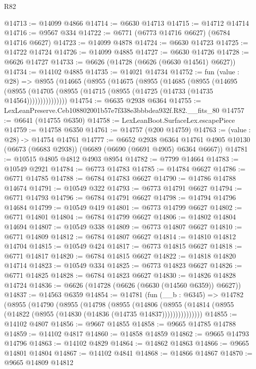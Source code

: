 \begin{lexlean}{R82}
\begin{coremodule}
@14713 := @14099 @4866
@14714 := @6630 @14713
@14715 := @14712 @14714
@14716 := @9567 @334
@14722 := @6771 (@6773 @14716 @6627) (@6784 @14716 @6627)
@14723 := @14099 @4878
@14724 := @6630 @14723
@14725 := @14722 @14724
@14726 := @14099 @4885
@14727 := @6630 @14726
@14728 := @6626 @14727
@14733 := @6626 (@14728 (@6626 (@6630 @14561) @6627))
@14734 := @14102 @4885
@14735 := @14021 @14734
@14752 := fun (value : @28) =>
  @8955
    (@14665
      (@8955
        (@14675
          (@8955
            (@14685
              (@8955
                (@14695
                  (@8955 (@14705 (@8955 (@14715 (@8955 (@14725 (@14733 (@14735 @14564)))))))))))))))
@14754 := @6635 @2938 @6364
@14755 := LexLeanPreserve.Ceb108802001b57e7f338e3bbbdea932f.R82.__fits_80
@14757 := @6641 (@14755 @6350)
@14758 := LexLeanBoot.SurfaceLex.escapePiece
@14759 := @14758 @6350
@14761 := @14757 (@200 @14759)
@14763 := (value : @28) -> @14754 @14761
@14777 := @6652
    @2938
    @6364
    @14761
    @4905
    @10130
    (@6673 (@6683 @2938))
    (@6689 (@6690 (@6691 @4905) @6364 @6667))
@14781 := @10515 @4805 @4812 @4903 @8954
@14782 := @7799 @14664
@14783 := @10549 @2921
@14784 := @6773 @14783
@14785 := @14784 @6627
@14786 := @6771 @14785
@14788 := @6784 @14783 @6627
@14790 := @14786 @14788 @14674
@14791 := @10549 @322
@14793 := @6773 @14791 @6627
@14794 := @6771 @14793
@14796 := @6784 @14791 @6627
@14798 := @14794 @14796 @14684
@14799 := @10549 @419
@14801 := @6773 @14799 @6627
@14802 := @6771 @14801
@14804 := @6784 @14799 @6627
@14806 := @14802 @14804 @14694
@14807 := @10549 @338
@14809 := @6773 @14807 @6627
@14810 := @6771 @14809
@14812 := @6784 @14807 @6627
@14814 := @14810 @14812 @14704
@14815 := @10549 @424
@14817 := @6773 @14815 @6627
@14818 := @6771 @14817
@14820 := @6784 @14815 @6627
@14822 := @14818 @14820 @14714
@14823 := @10549 @334
@14825 := @6773 @14823 @6627
@14826 := @6771 @14825
@14828 := @6784 @14823 @6627
@14830 := @14826 @14828 @14724
@14836 := @6626 (@14728 (@6626 (@6630 (@14560 @6359)) @6627))
@14837 := @14563 @6359
@14854 := @14781
    (fun (__b : @6345) =>
    @14782
      (@8955
        (@14790
          (@8955
            (@14798
              (@8955
                (@14806
                  (@8955 (@14814 (@8955 (@14822 (@8955 (@14830 (@14836 (@14735 @14837)))))))))))))))
@14855 := @14102 @4807
@14856 := @9667 @14855
@14858 := @9665 @14785 @14788
@14859 := @14102 @4817
@14860 := @14858 @14859
@14862 := @9665 @14793 @14796
@14863 := @14102 @4829
@14864 := @14862 @14863
@14866 := @9665 @14801 @14804
@14867 := @14102 @4841
@14868 := @14866 @14867
@14870 := @9665 @14809 @14812

\end{coremodule}
\end{lexlean}
